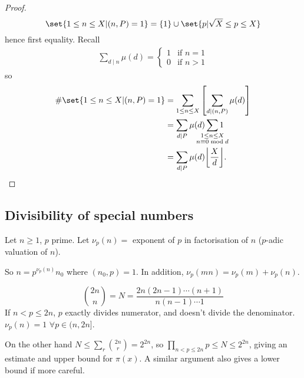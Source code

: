\documentclass{article}
\DeclarePairedDelimiter\floor{\lfloor}{\rfloor}
\begin{document}
\begin{proof}
    \begin{equation*}
        \set{1 \leq n \leq X | (n, P) = 1} = \{1\} \cup \set{p | \sqrt{X} \leq p \leq X}
    \end{equation*}
    hence first equality. Recall
    \begin{gather*}
        \sum_{d \mid n} \mu(d) =
        \begin{cases}
            1 & \text{if } n = 1 \\
            0 & \text{if } n > 1
        \end{cases}
    \end{gather*}
        so
    \begin{align*}
        \# \set{1 \leq n \leq X | (n, P) = 1} &= \sum_{1 \leq n \leq X} \left[ \sum_{d \mid (n, P)} \mu(d)\right] \\
                                              &= \sum_{d \mid P} \mu(d) \sum_{\mathclap{\substack{1 \leq n \leq X \\ n \equiv 0 \bmod{d}}}} 1 \\
                                              &= \sum_{d \mid P} \mu(d) \floor*{\frac{X}{d}}.
    \end{align*}
\end{proof}

\subsection{Divisibility of special numbers}
\begin{defi}
    Let $n \geq 1$, $p$ prime. Let $\nu_p(n)=$ exponent of $p$ in factorisation of $n$ ($p$-adic valuation of $n$).
\end{defi}

So $n = p^{\nu_p(n)} n_0$ where $(n_0, p) = 1$.  In addition, $\nu_p(mn) = \nu_p(m) + \nu_p(n)$.

\begin{eg}
    \begin{equation*}
        \binom{2n}{n} = N = \frac{2n (2n-1) \dotsm (n+1)}{n (n-1) \dotsm 1}
    \end{equation*}
    If $n < p \leq 2n$, $p$ exactly divides numerator, and doesn't divide the denominator.
    $\nu_p(n) = 1$ $\forall p \in (n, 2n]$.

    On the other hand $N \leq \sum_r \binom{2n}{r} = 2^{2n}$, so $\prod_{n < p \leq 2n} p \leq N \leq 2^{2n}$, giving an estimate and upper bound for $\pi(x)$.
    A similar argument also gives a lower bound if more careful.
\end{eg}
\end{document}
